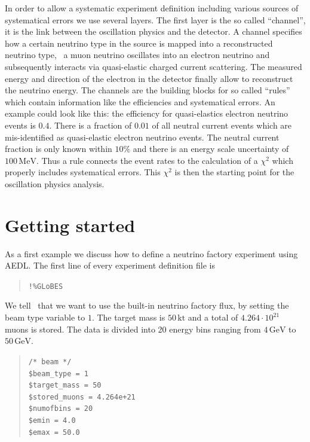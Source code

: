 In order to allow a systematic experiment definition including various
sources of systematical errors we use several layers. The first layer is
the so called ``channel'', it is the link between the oscillation physics
and the detector. A channel specifies how a certain neutrino type in the 
source is mapped into a reconstructed neutrino type, \eg\ a muon neutrino
oscillates into an electron neutrino and subsequently interacts via
quasi-elastic charged current scattering. The measured energy and direction of
the electron in the detector finally allow to reconstruct the neutrino energy.
The channels are the building blocks for so called ``rules'' which
contain information like the efficiencies and systematical errors. An example
could look like this: the efficiency for quasi-elastics electron neutrino
events is $0.4$. There is a fraction of $0.01$ of all neutral current events
which are mis-identified as quasi-elastic electron neutrino events. 
The neutral current fraction is only known within $10\%$ and there is
an energy scale uncertainty of $100\,\mathrm{MeV}$. Thus a rule connects the
event rates to the calculation of a $\chi^2$ which properly includes 
systematical errors. This $\chi^2$ is then the starting point for the
oscillation physics analysis.

\chapter{Getting started}

As a first example we discuss how to define a neutrino factory experiment using
AEDL. The first line of every experiment definition file is
\begin{quote}
{\tt !\%GLoBES}
\end{quote}

We tell \GLOBES\ that we want to use the built-in neutrino factory
flux, by setting the beam type variable to $1$. The target mass 
is $50\,\mathrm{kt}$ and a total of $ 4.264\cdot10^{21}$
muons is stored. The data is divided into 20 energy bins ranging from
$4\,\mathrm{GeV}$ to $50\,\mathrm{GeV}$. 
\begin{quote}
{\tt /* beam */}\\
{\tt \$beam\_type = 1}\\
{\tt \$target\_mass = 50}\\
{\tt \$stored\_muons = 4.264e+21}\\
{\tt \$numofbins = 20}\\
{\tt \$emin = 4.0}\\
{\tt \$emax = 50.0}
\end{quote}

